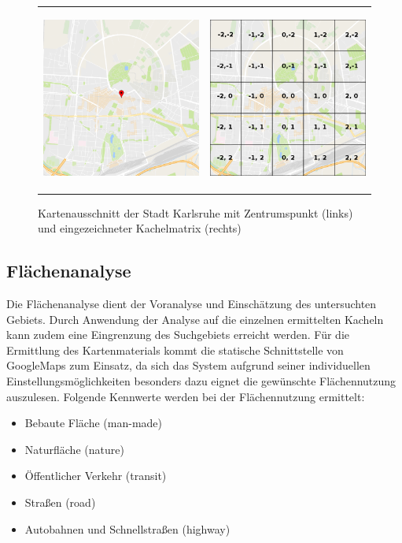 \begin{figure}
\centering
\begin{tabular}{@{}cc@{}}
    \includegraphics[height=6cm]{images/Karlsruhe_with_center.png} &
    \includegraphics[height=6cm]{images/Karlsruhe_grid.png} \\
\end{tabular}
\caption{Kartenausschnitt der Stadt Karlsruhe mit Zentrumspunkt (links) und eingezeichneter Kachelmatrix (rechts)}
\label{fig:tilemap}
\end{figure}

\subsection{Flächenanalyse}
\label{sec:area-analysis}

Die Flächenanalyse dient der Voranalyse und Einschätzung des untersuchten Gebiets. Durch Anwendung der Analyse auf die einzelnen ermittelten Kacheln kann zudem eine Eingrenzung des Suchgebiets erreicht werden. Für die Ermittlung des Kartenmaterials kommt  die statische Schnittstelle von GoogleMaps zum Einsatz, da sich das System aufgrund seiner individuellen Einstellungsmöglichkeiten besonders dazu eignet die gewünschte Flächennutzung auszulesen. Folgende Kennwerte werden bei der Flächennutzung ermittelt:

\begin{itemize}\itemsep -2pt
\item Bebaute Fläche (man-made)
\item Naturfläche (nature)
\item Öffentlicher Verkehr (transit)
\item Straßen (road)
\item Autobahnen und Schnellstraßen (highway)
\end{itemize}

